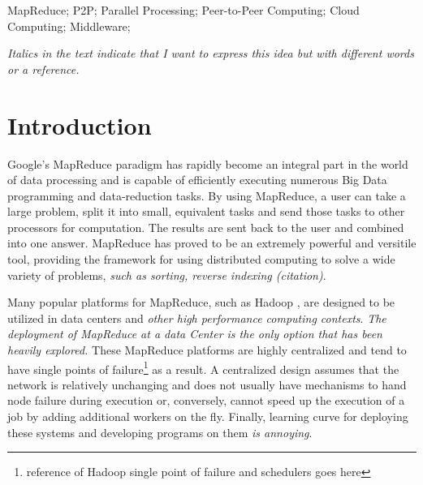 \documentclass[10pt, conference, compsocconf]{IEEEtran}
\begin{document}
\begin{IEEEkeywords}
MapReduce; P2P; Parallel Processing; Peer-to-Peer Computing; Cloud Computing; Middleware;

\end{IEEEkeywords}


\textit{Italics in the text indicate that I want to express this idea but with different words or a reference.}
\section{Introduction}




Google's MapReduce \cite{mapreduce} paradigm has rapidly become an integral part in the world of data processing and is capable of efficiently executing numerous Big Data programming and data-reduction tasks.  By using MapReduce, a user can take a large problem, split it into small, equivalent tasks and send those tasks to other processors for computation.  The results are sent back to the user and combined into one answer.  MapReduce has proved to be an extremely powerful and versitile tool, providing the framework for using distributed computing to solve a wide variety of problems, \textit{such as sorting, reverse indexing  (citation)}. 



Many popular platforms for MapReduce, such as Hadoop \cite{Hadoop}, are designed to be utilized in data centers and \textit{other high performance computing contexts}.  
\textit{The deployment of MapReduce at a data Center is the only option that has been heavily explored.}  
These MapReduce platforms are highly centralized and tend to have single points of failure\footnote{reference of Hadoop single point of failure and schedulers goes here} as a result.   A centralized design assumes that the network is relatively unchanging and does not usually have mechanisms to hand node failure during execution or, conversely, cannot speed up the execution of a job by adding additional workers on the fly.   Finally, learning curve for deploying these systems and developing programs on them \textit{is annoying}.
\end{document}

